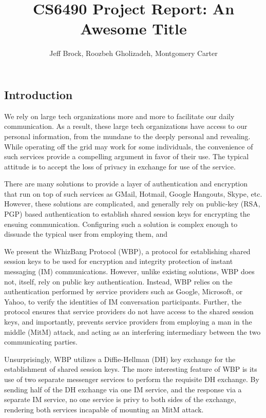 \documentclass[twoside]{article}
\title{CS6490 Project Report: An Awesome Title}
\author{Jeff Brock, Roozbeh Gholizadeh, Montgomery Carter}
\date{}
\begin{document}
\maketitle
\newpage
\begin{multicols}{2}

\section{Introduction}
We rely on large tech organizations more and more to facilitate our daily communication.  As a result, these large tech organizations have access to our personal information, from the mundane to the deeply personal and revealing.  While operating off the grid may work for some individuals, the convenience of such services provide a compelling argument in favor of their use.  The typical attitude is to accept the loss of privacy in exchange for use of the service.

There are many solutions to provide a layer of authentication and encryption that run on top of such services as GMail, Hotmail, Google Hangouts, Skype, etc.  However, these solutions are complicated, and generally rely on public-key (RSA, PGP) based authentication to establish shared session keys for encrypting the ensuing communication.  Configuring such a solution is complex enough to dissuade the typical user from employing them, and 

We present the WhizBang Protocol (WBP), a protocol for establishing shared session keys to be used for encryption and integrity protection of instant messaging (IM) communications.  However, unlike existing solutions, WBP does not, itself, rely on public key authentication.  Instead, WBP relies on the authentication performed by service providers such as Google, Microsoft, or Yahoo, to verify the identities of IM conversation participants.  Further, the protocol ensures that service providers do not have access to the shared session keys, and importantly, prevents service providers from employing a man in the middle (MitM) attack, and acting as an interfering intermediary between the two communicating parties.

Unsurprisingly, WBP utilizes a Diffie-Hellman (DH) key exchange for the establishment of shared session keys.  The more interesting feature of WBP is its use of two separate messenger services to perform the requisite DH exchange.  By sending half of the DH exchange via one IM service, and the response via a separate IM service, no one service is privy to both sides of the exchange, rendering both services incapable of mounting an MitM attack.


\end{multicols}
\end{document}
